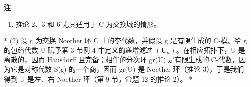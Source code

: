 \textbf{注}\par

\begin{enumerate}
\def\labelenumi{(\arabic{enumi})}
\tightlist
\item
	  推论 2、3 和 6 尤其适用于 C 为交换域的情形。
\end{enumerate}

	* (2) 设 g 为交换 Noether 环 C 上的李代数，并假设 g 是有限生成的 C-模。给 g 的包络代数 U 赋予第 3 节例 4 中定义的递增滤过 \((\mathbf{U}_{n})\)。在相应拓扑下，U 是离散的，因而 Hausdorff 且完备；相伴的分次环 gr(U) 是有限生成的 C-代数，因为它是对称代数 S(g) 的一个商，因而 gr(U) 是 Noether 环（推论 3），于是我们得到 U 是左、右 Noether 环（第 9 节，命题 12 的推论 2）。 *

